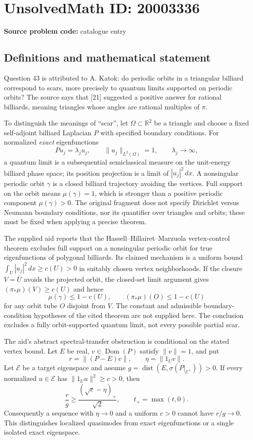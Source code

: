 \documentclass[11pt]{article}
\newcommand{\R}{\mathbb{R}}
\begin{document}
\section*{UnsolvedMath ID: 20003336}
\textbf{Source problem code:} catalogue entry
\subsection{Definitions and mathematical statement}
Question 43 is attributed to A. Katok: do periodic orbits in a triangular billiard correspond to scars, more precisely to quantum limits supported on periodic orbits? The source says that [21] suggested a positive answer for rational billiards, meaning triangles whose angles are rational multiples of $\pi$.

To distinguish the meanings of ``scar'', let $\Omega\subset\R^2$ be a triangle and choose a fixed self-adjoint billiard Laplacian $P$ with specified boundary conditions. For normalized \emph{exact} eigenfunctions
\[
 P u_j=\lambda_j u_j,\qquad \|u_j\|_{L^2(\Omega)}=1,
 \qquad \lambda_j\to\infty,
\]
a quantum limit is a subsequential semiclassical measure on the unit-energy billiard phase space; its position projection is a limit of $|u_j|^2\,dx$. A nonsingular periodic orbit $\gamma$ is a closed billiard trajectory avoiding the vertices. Full support on the orbit means $\mu(\gamma)=1$, which is stronger than a positive periodic component $\mu(\gamma)>0$. The original fragment does not specify Dirichlet versus Neumann boundary conditions, nor its quantifier over triangles and orbits; these must be fixed when applying a precise theorem.

The supplied aid reports that the Hassell--Hillairet--Marzuola vertex-control theorem excludes full support on a nonsingular periodic orbit for true eigenfunctions of polygonal billiards. Its claimed mechanism is a uniform bound $\int_U|u_j|^2\,dx\geq c(U)>0$ in suitably chosen vertex neighborhoods. If the closure $V=\overline U$ avoids the projected orbit, the closed-set limit argument gives $(\pi_*\mu)(V)\geq c(U)$ and hence
\[
 \mu(\gamma)\leq1-c(U),\qquad
 (\pi_*\mu)(O)\leq1-c(U)
\]
for any orbit tube $O$ disjoint from $V$. The constant and admissible boundary-condition hypotheses of the cited theorem are not supplied here. The conclusion excludes a fully orbit-supported quantum limit, not every possible partial scar.

The aid's abstract spectral-transfer obstruction is conditional on the stated vertex bound. Let $E$ be real, $v\in\operatorname{Dom}(P)$ satisfy $\|v\|=1$, and put
\[
 r=\|(P-E)v\|,\qquad \eta=\|1_Uv\|.
\]
Let $\mathcal E$ be a target eigenspace and assume $g=\operatorname{dist}(E,\sigma(P|_{\mathcal E^\perp}))>0$. If every normalized $u\in\mathcal E$ has $\|1_Uu\|^2\geq c>0$, then
\[
 \frac r g\geq\frac{(\sqrt c-\eta)_+}{\sqrt2},
 \qquad t_+=\max(t,0).
\]
Consequently a sequence with $\eta\to0$ and a uniform $c>0$ cannot have $r/g\to0$. This distinguishes localized quasimodes from exact eigenfunctions or a single isolated exact eigenspace.
\end{document}
